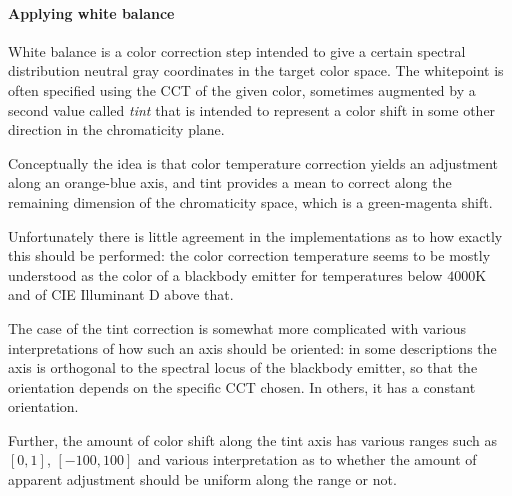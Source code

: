%   

\paragraph{Applying white balance}
White balance is a color correction step intended to give a certain spectral distribution 
 neutral gray coordinates in the target color space.
The whitepoint is often specified using the \gls{CCT} of the given color,
sometimes augmented by a second value called \textsl{tint} that is intended to represent a color shift 
in some other direction in the chromaticity plane. 
    
    Conceptually the idea is that
color temperature correction yields an adjustment along an orange-blue axis, and tint provides
a mean to correct along the remaining dimension of the chromaticity space, which is a green-magenta shift.

Unfortunately there is little agreement in the implementations as to how exactly this should be performed:
the color correction temperature seems to be mostly understood as the color of a blackbody emitter for
temperatures below $4000\unit{\kelvin}$ and of \gls{CIE} Illuminant D above that. 

The case of the tint correction is somewhat more complicated with various interpretations 
of how such an axis should be oriented: in some descriptions the axis is orthogonal to the 
spectral locus of the blackbody emitter, so that the orientation depends on the specific 
\gls{CCT} chosen. In others, it has a constant orientation. 

Further, the amount of color shift along the tint axis has various ranges such as $[0,1]$, 
$[-100,100]$ and various interpretation as to whether the amount of apparent adjustment should be 
uniform along the range or not.

